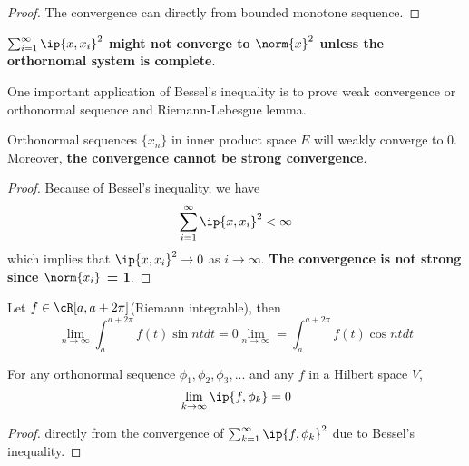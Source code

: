 \begin{refsection}
\begin{proof}
	The convergence can directly from bounded monotone sequence. 
\end{proof}


\begin{remark}
	\textbf{$\sum_{i=1}^\infty \ip{x,x_i}^2$ might not converge to $\norm{x}^2$ unless the orthornomal system is complete}.   
\end{remark}


\begin{remark}
	One important application of Bessel's inequality is to prove weak convergence or orthonormal sequence and Riemann-Lebesgue lemma.
\end{remark}


\begin{corollary}
	\cite[185]{debnath2005hilbert} Orthonormal sequences $\{x_n\}$ in inner product space $E$ will weakly converge to 0. Moreover, \textbf{the convergence cannot be strong convergence}.
\end{corollary}
\begin{proof}
	Because of Bessel's inequality, we have 
	$$\sum_{i=1}^\infty \ip{x,x_i}^2 < \infty$$
	which implies that $\ip{x,x_i}^2 \to 0$ as $i\to \infty$.
	\textbf{The convergence is not strong since $\norm{x_i}$ = 1}.
\end{proof}


\begin{theorem}
	\cite[306]{johnsonbaugh2010foundations} Let $f\in \cR[a,a+2\pi]$(Riemann integrable), then
	$$\lim_{n\to \infty} \int_a^{a+2\pi} f(t) \sin nt dt = 0 \lim_{n\to \infty} =\int_a^{a+2\pi} f(t) \cos nt dt$$
\end{theorem}

\begin{theorem}
	\cite[306]{johnsonbaugh2010foundations}
	For any orthonormal sequence $\phi_1,\phi_2, \phi_3, ...$ and any $f$ in a Hilbert space $V$, $$\lim_{k\rightarrow \infty} \ip{f,\phi_k} = 0$$
\end{theorem}
\begin{proof}
	directly from the convergence of $\sum_{k=1}^\infty \ip{f,\phi_k}^2$ due to Bessel's inequality. 	
\end{proof}





\end{refsection}
